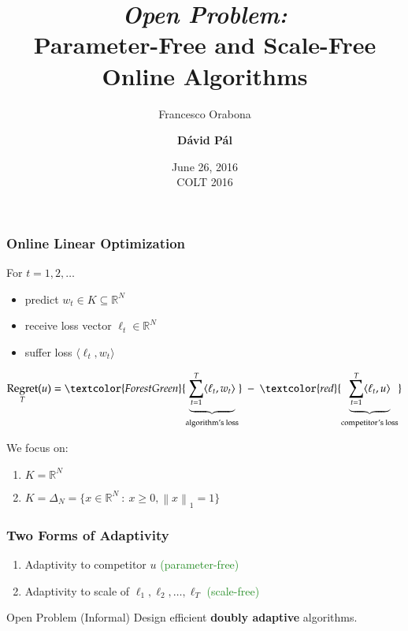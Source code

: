 \documentclass[usenames,dvipsnames]{beamer}
\title{\emph{Open Problem:} \\ Parameter-Free and Scale-Free \\ Online Algorithms}
\date{June 26, 2016 \\ \tiny COLT 2016}
\author{Francesco Orabona \and \textbf{D\'avid P\'al}}
\institute{Yahoo Research, New York}
\DeclareMathOperator{\Regret}{Regret}
\newcommand{\R}{\mathbb{R}}
\newcommand{\norm}[1]{\left\|#1\right\|}
\begin{document}
\begin{frame}
\maketitle
\end{frame}

\begin{frame}
\frametitle{Online Linear Optimization}

For $t=1,2,\dots$
\begin{itemize}
\item predict $w_t \in K \subseteq \R^N$
\item receive loss vector $\ell_t \in \R^N$
\item suffer loss $\langle \ell_t, w_t \rangle$
\end{itemize}

\vspace{0.5cm}
$$
\Regret_T(u) = \textcolor{ForestGreen}{\underbrace{\sum_{t=1}^T \langle \ell_t, w_t \rangle}_{\text{algorithm's loss}}} \ - \ \textcolor{red}{\underbrace{\sum_{t=1}^T \langle \ell_t, u \rangle}_{\text{competitor's loss}}}
$$

\vspace{0.5cm}

We focus on:
\begin{enumerate}
\item $K = \R^N$
\item $K = \Delta_N = \{ x \in \R^N ~:~ x \ge 0, \norm{x}_1 = 1 \}$
\end{enumerate}

\end{frame}

\begin{frame}
\frametitle{Two Forms of Adaptivity}

\begin{enumerate}
\item Adaptivity to competitor $u$ \qquad \qquad \textcolor{ForestGreen}{(parameter-free)}
\item Adaptivity to scale of $\ell_1, \ell_2, \dots, \ell_T$ \qquad \qquad \textcolor{ForestGreen}{(scale-free)}
\end{enumerate}

\vspace{1cm}

\begin{block}{Open Problem (Informal)}
Design efficient \textbf{doubly adaptive} algorithms.
\end{block}

\end{frame}
\end{document}
